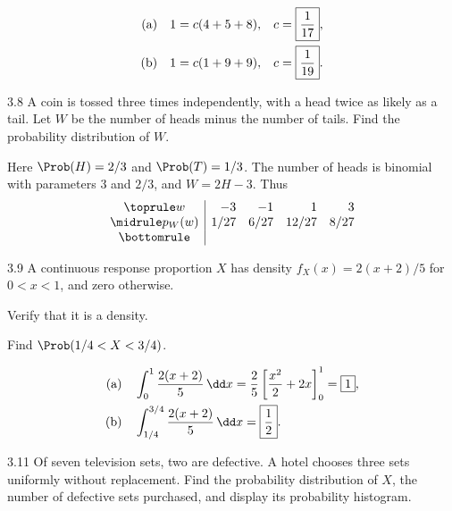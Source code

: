 \documentclass[11pt,oneside]{article}
\begin{document}
\begin{solution}
\begin{align*}
\textup{(a)}\quad&1=c(4+5+8),&c&=\boxed{\frac1{17}},\\
\textup{(b)}\quad&1=c(1+9+9),&c&=\boxed{\frac1{19}}.
\end{align*}
\end{solution}

\begin{exercise}{3.8}
A coin is tossed three times independently, with a head twice as likely as a tail. Let $W$ be the number of heads minus the number of tails. Find the probability distribution of $W$.
\end{exercise}

\begin{solution}
Here $\Prob(H)=2/3$ and $\Prob(T)=1/3$. The number of heads is binomial with parameters $3$ and $2/3$, and $W=2H-3$. Thus
\[
\begin{array}{c|rrrr}\toprule
w&-3&-1&1&3\\\midrule
p_W(w)&1/27&6/27&12/27&8/27\\\bottomrule
\end{array}
\]
\end{solution}

\begin{exercise}{3.9}
A continuous response proportion $X$ has density $f_X(x)=2(x+2)/5$ for $0<x<1$, and zero otherwise.
\begin{exercisesubparts}
\item Verify that it is a density.
\item Find $\Prob(1/4<X<3/4)$.
\end{exercisesubparts}
\end{exercise}

\begin{solution}
\begin{align*}
\textup{(a)}\quad&\int_0^1\frac{2(x+2)}5\,\dd x
=\frac25\left[\frac{x^2}{2}+2x\right]_0^1=\boxed{1},\\
\textup{(b)}\quad&\int_{1/4}^{3/4}\frac{2(x+2)}5\,\dd x
=\boxed{\frac12}.
\end{align*}
\end{solution}

\begin{exercise}{3.11}
Of seven television sets, two are defective. A hotel chooses three sets uniformly without replacement. Find the probability distribution of $X$, the number of defective sets purchased, and display its probability histogram.
\end{exercise}
\end{document}
